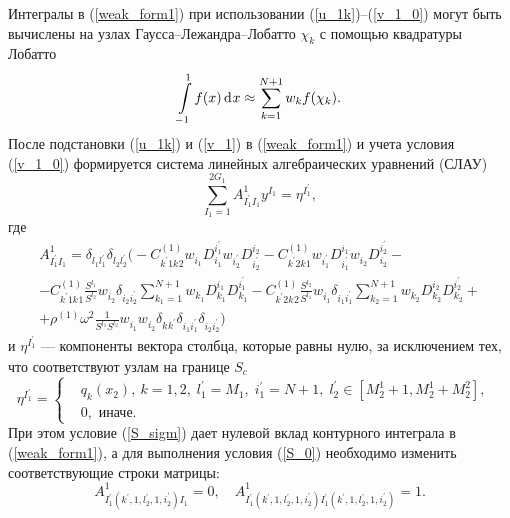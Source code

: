 \documentclass[press]{vestnik}
\begin{document}
Интегралы в (\ref{weak_form1}) при использовании (\ref{u_1k})--(\ref{v_1_0}) могут быть вычислены на узлах Гаусса--Лежандра--Лобатто $\chi_{k}$ с помощью квадратуры Лобатто \cite{Ostachowicz}
$$
\int\limits_{-1}^{1} f(x) \d x \approx \sum_{k=1}^{N+1} w_k f(\chi_{k}).
$$
После подстановки (\ref{u_1k}) и (\ref{v_1}) в (\ref{weak_form1}) и учета условия (\ref{v_1_0}) формируется система линейных алгебраических уравнений (СЛАУ)
$$
\sum_{I_1 = 1}^{2G_{1}} A_{I_{1}^{'} I_{1}^{}}^{1} y^{I_1} = \eta_{}^{{I_{1}^{'}}},
$$
где
\begin{multline}
	A_{I_{1}^{'} I_{1}}^{1} = \delta_{l_{1}^{} l_{1}^{'}} \delta_{l_{2}^{} l_{2}^{'}} 
	\Bigg( 
	-C_{k^{'}1k^{}2}^{(1)} w_{i_{1}}^{} D_{i_{1}}^{i_{1}^{'}} w_{i_{2}^{'}} D_{i_{2}^{'}}^{i_{2}}
	-C_{k^{'}2k^{}1}^{(1)} w_{i_{1}^{'}} D_{i_{1}^{'}}^{i_{1}} w_{i_{2}}^{} D_{i_{2}}^{i_{2}^{'}}-
	\\
	-C_{k^{'}1k^{}1}^{(1)} \frac{S^{l_{1}}}{S^{l_{2}}} w_{i_{2}}^{} \delta_{i_{2}^{} i_{2}^{'}} \sum_{k_{1}=1}^{N+1} w_{k_{1}}^{} D_{k_{1}}^{i_{1}^{}} D_{k_{1}}^{i_{1}^{'}}
	-C_{k^{'}2k^{}2}^{(1)} \frac{S^{l_2}}{S^{l_1}} w_{i_1}^{} \delta_{i_{1}^{} i_{1}^{'}} \sum_{k_{2}=1}^{N+1} w_{k_{2}}^{} D_{k_{2}}^{i_{2}^{}} D_{k_{2}}^{i_{2}^{'}}+
	\\
	+\rho^{(1)} \omega^{2} \frac{1}{S^{l_{1}}S^{l_{2}}} w_{i_{1}}^{} w_{i_{2}}^{} \delta_{k^{} k^{'}} \delta_{i_{1}^{} i_{1}^{'}} \delta_{i_{2}^{} i_{2}^{'}}
	\Bigg)
\end{multline}
и $\eta_{}^{{I_{1}^{'}}}$ --- компоненты вектора столбца, которые равны нулю, за исключением тех, что соответствуют узлам на границе $S_{c}$
$$
\eta^{{I_{1}^{'}}}= 
\left\{ 
\begin{aligned}
	&q_{k}(x_{2}), \ k=1, 2, \; l_{1}^{'}=M_{1}, \; i_{1}^{'}=N+1, \; l_{2}^{'} \in [M_{2}^{1}+1, M_{2}^{1}+M_{2}^{2}],& \\[2mm]
	&0, \text{ иначе}.&
\end{aligned} 
\right.
$$
При этом условие (\ref{S_sigm}) дает нулевой вклад контурного интеграла в (\ref{weak_form1}), а для выполнения условия (\ref{S_0}) необходимо изменить соответствующие строки матрицы:
$$
A_{I_{1}^{'}(k^{'},1,l_{2}^{'},1,i_{2}^{'}) I_{1}^{}}^{1} = 0, \quad A_{I_{1}^{'}(k^{'},1,l_{2}^{'},1,i_{2}^{'}) I_{1}^{'}(k^{'},1,l_{2}^{'},1,i_{2}^{'})}^{1} = 1.
$$
\end{document}
